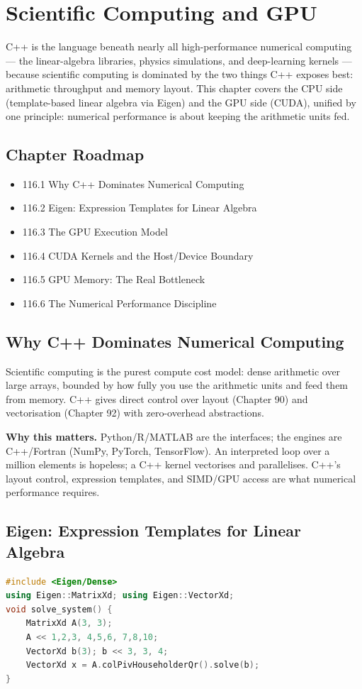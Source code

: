 \chapter{Scientific Computing and GPU}

C++ is the language beneath nearly all high-performance numerical computing --- the linear-algebra libraries, physics simulations, and deep-learning kernels --- because scientific computing is dominated by the two things C++ exposes best: arithmetic throughput and memory layout. This chapter covers the CPU side (template-based linear algebra via Eigen) and the GPU side (CUDA), unified by one principle: numerical performance is about keeping the arithmetic units fed.

\section*{Chapter Roadmap}
\begin{itemize}
\item 116.1 Why C++ Dominates Numerical Computing
\item 116.2 Eigen: Expression Templates for Linear Algebra
\item 116.3 The GPU Execution Model
\item 116.4 CUDA Kernels and the Host/Device Boundary
\item 116.5 GPU Memory: The Real Bottleneck
\item 116.6 The Numerical Performance Discipline
\end{itemize}

\section{Why C++ Dominates Numerical Computing}
Scientific computing is the purest compute cost model: dense arithmetic over large arrays, bounded by how fully you use the arithmetic units and feed them from memory. C++ gives direct control over layout (Chapter 90) and vectorisation (Chapter 92) with zero-overhead abstractions.

\textbf{Why this matters.} Python/R/MATLAB are the interfaces; the engines are C++/Fortran (NumPy, PyTorch, TensorFlow). An interpreted loop over a million elements is hopeless; a C++ kernel vectorises and parallelises. C++'s layout control, expression templates, and SIMD/GPU access are what numerical performance requires.

\section{Eigen: Expression Templates for Linear Algebra}
\begin{lstlisting}[language=C++, caption={Eigen: natural syntax, fused evaluation. Non-portable. Min standard: C++14.}]
#include <Eigen/Dense>
using Eigen::MatrixXd; using Eigen::VectorXd;
void solve_system() {
    MatrixXd A(3, 3);
    A << 1,2,3, 4,5,6, 7,8,10;
    VectorXd b(3); b << 3, 3, 4;
    VectorXd x = A.colPivHouseholderQr().solve(b);
}
\end{lstlisting}


